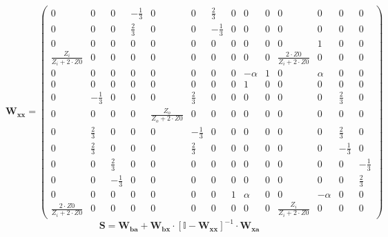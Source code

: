 \[ \mathbf{W_{xx}} = \left(\begin{smallmatrix} 0 & 0 & 0 & -\frac{1}{3} & 0 & 0 & \frac{2}{3} & 0 & 0 & 0 & 0 & 0 & 0 & 0 \\ 0 & 0 & 0 & \frac{2}{3} & 0 & 0 & -\frac{1}{3} & 0 & 0 & 0 & 0 & 0 & 0 & 0 \\ 0 & 0 & 0 & 0 & 0 & 0 & 0 & 0 & 0 & 0 & 0 & 1 & 0 & 0 \\ \frac{Z_i}{Z_i+2\cdot Z0} & 0 & 0 & 0 & 0 & 0 & 0 & 0 & 0 & 0 & \frac{2\cdot Z0}{Z_i+2\cdot Z0} & 0 & 0 & 0 \\ 0 & 0 & 0 & 0 & 0 & 0 & 0 & 0 & -\alpha & 1 & 0 & \alpha & 0 & 0 \\ 0 & 0 & 0 & 0 & 0 & 0 & 0 & 0 & 1 & 0 & 0 & 0 & 0 & 0 \\ 0 & -\frac{1}{3} & 0 & 0 & 0 & \frac{2}{3} & 0 & 0 & 0 & 0 & 0 & 0 & \frac{2}{3} & 0 \\ 0 & 0 & 0 & 0 & \frac{Z_o}{Z_o+2\cdot Z0} & 0 & 0 & 0 & 0 & 0 & 0 & 0 & 0 & 0 \\ 0 & \frac{2}{3} & 0 & 0 & 0 & -\frac{1}{3} & 0 & 0 & 0 & 0 & 0 & 0 & \frac{2}{3} & 0 \\ 0 & \frac{2}{3} & 0 & 0 & 0 & \frac{2}{3} & 0 & 0 & 0 & 0 & 0 & 0 & -\frac{1}{3} & 0 \\ 0 & 0 & \frac{2}{3} & 0 & 0 & 0 & 0 & 0 & 0 & 0 & 0 & 0 & 0 & -\frac{1}{3} \\ 0 & 0 & -\frac{1}{3} & 0 & 0 & 0 & 0 & 0 & 0 & 0 & 0 & 0 & 0 & \frac{2}{3} \\ 0 & 0 & 0 & 0 & 0 & 0 & 0 & 1 & \alpha & 0 & 0 & -\alpha & 0 & 0 \\ \frac{2\cdot Z0}{Z_i+2\cdot Z0} & 0 & 0 & 0 & 0 & 0 & 0 & 0 & 0 & 0 & \frac{Z_i}{Z_i+2\cdot Z0} & 0 & 0 & 0 \end{smallmatrix}\right) \]
\[ \mathbf{S}=\mathbf{W_{ba}}+\mathbf{W_{bx}}\cdot\left[ \mathbb{I}  -\mathbf{W_{xx}}\right]^{-1}\cdot\mathbf{W_{xa}} \]
